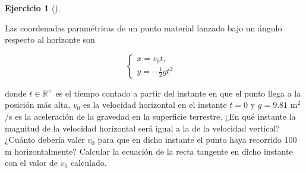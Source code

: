 \documentclass[
  a4paper,
]{scrreport}
\theoremstyle{definition}
\newtheorem{exercise}{Ejercicio}[chapter]
\theoremstyle{remark}
\begin{document}
\leavevmode{}%
\begin{exercise}[]\label{exr-trayectorias-2}

Las coordenadas paramétricas de un punto material lanzado bajo un ángulo
respecto al horizonte son

\[
\begin{cases}
x=v_0t, & \\
y=-\frac{1}{2}gt^2
\end{cases}
\]

donde \(t\in \mathbb{R}^{+}\) es el tiempo contado a partir del instante
en que el punto llega a la posición más alta, \(v_0\) es la velocidad
horizontal en el instante \(t=0\) y \(g=9.81\) m\(^2\)/s es la
aceleración de la gravedad en la superficie terrestre. ¿En qué instante
la magnitud de la velocidad horizontal será igual a la de la velocidad
vertical? ¿Cuánto debería valer \(v_0\) para que en dicho instante el
punto haya recorrido 100 m horizontalmente? Calcular la ecuación de la
recta tangente en dicho instante con el valor de \(v_0\) calculado.

\end{exercise}
\end{document}
